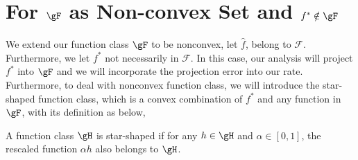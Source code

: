 \documentclass[twoside,11pt]{article}
\begin{document}
\section{For $\gF$ as Non-convex Set and $f^* \notin \gF$}

We extend our function class $\gF$ to be nonconvex, let $\hat f$, belong to $\mathcal{F}$. Furthermore, we let $f^*$  not necessarily in $\mathcal{F}$. 
In this case, our analysis will project $f^\ast$ into $\gF$ and we will incorporate the projection error into our rate. 
Furthermore, to deal with nonconvex function class, we will introduce the star-shaped function class, which is a convex combination of $f^\ast$ and any function in $\gF$, with its definition as below, 

\begin{definition}
    A function class $\gH$ is star-shaped if for any $h \in \gH$ and $\alpha \in [0, 1]$, the rescaled function $\alpha h$ also belongs to $\gH$.
\end{definition}
\end{document}
